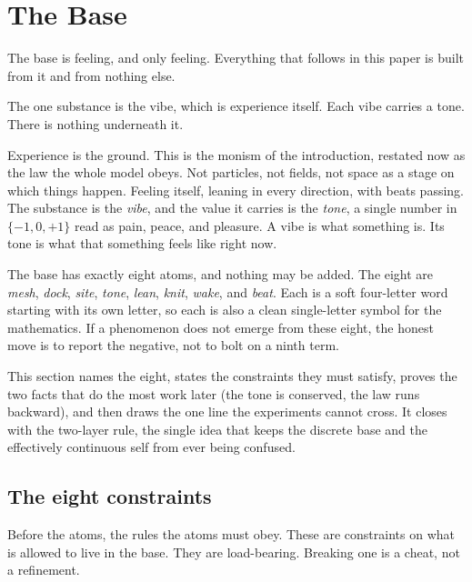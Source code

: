 \section{The Base}

The base is feeling, and only feeling. Everything that follows in this paper is built from it and from nothing else.

\begin{axiom}
The one substance is the vibe, which is experience itself. Each vibe carries a tone. There is nothing underneath it.
\end{axiom}

Experience is the ground. This is the monism of the introduction, restated now as the law the whole model obeys. Not particles, not fields, not space as a stage on which things happen. Feeling itself, leaning in every direction, with beats passing. The substance is the \emph{vibe}, and the value it carries is the \emph{tone}, a single number in $\{-1, 0, +1\}$ read as pain, peace, and pleasure. A vibe is what something is. Its tone is what that something feels like right now.

The base has exactly eight atoms, and nothing may be added. The eight are \emph{mesh}, \emph{dock}, \emph{site}, \emph{tone}, \emph{lean}, \emph{knit}, \emph{wake}, and \emph{beat}. Each is a soft four-letter word starting with its own letter, so each is also a clean single-letter symbol for the mathematics. If a phenomenon does not emerge from these eight, the honest move is to report the negative, not to bolt on a ninth term.

This section names the eight, states the constraints they must satisfy, proves the two facts that do the most work later (the tone is conserved, the law runs backward), and then draws the one line the experiments cannot cross. It closes with the two-layer rule, the single idea that keeps the discrete base and the effectively continuous self from ever being confused.

\subsection{The eight constraints}

Before the atoms, the rules the atoms must obey. These are constraints on what is allowed to live in the base. They are load-bearing. Breaking one is a cheat, not a refinement.

